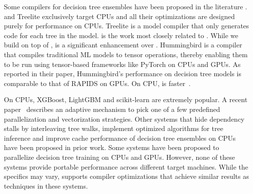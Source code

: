 Some compilers for decision tree ensembles have been proposed in the 
literature \cite{Treelite, Treebeard, Hummingbird}. \TreebeardOLD{} and Treelite
exclusively target CPUs and all their optimizations are designed purely for 
performance on CPUs. 
Treelite\cite{Treelite} is a model compiler that only  
generates  code for each tree in the model. 
\TreebeardOLD{} is the work most closely related to \Treebeard{}. While we 
build on top of \TreebeardOLD{}, \Treebeard{} is a significant enhancement 
over \TreebeardOLD{}. 
Hummingbird\cite{Hummingbird} is a compiler that compiles traditional ML models
to tensor operations, thereby enabling them to be run using tensor-based frameworks like
PyTorch\cite{NEURIPS2019_9015} on CPUs and GPUs. As reported in their paper, Hummingbird's performance
on decision tree models is comparable to that of RAPIDS on GPUs. On CPU, \TreebeardOLD{} 
is faster~\cite{Treebeard}.

On CPUs, XGBoost\cite{XGBoost}, LightGBM\cite{LightGBM} and
scikit-learn\cite{Sklearn} are extremely popular.
A recent paper~\cite{PACTVanLunteren} describes an adaptive mechanism 
to pick one of a few predefined parallelization and vectorization strategies.
Other systems that hide dependency stalls by interleaving tree walks\cite{VPred},
implement optimized algorithms for tree inference\cite{QuickScorer, QuickScorer1}
and improve cache performance of decision tree ensembles on CPUs\cite{CacheConscious1, CacheConscious2}
have been proposed in prior work.
Some systems have been proposed to parallelize decision tree training 
on CPUs and GPUs\cite{Jansson2014gpuRFAG, Nasridinov2013DecisionTC}.
However, none of these systems provide portable performance across different target machines.
While the specifics may vary, \Treebeard{} supports compiler optimizations that 
achieve similar results as techniques in these systems.

